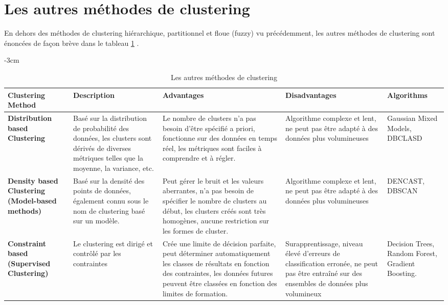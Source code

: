 \section{Les autres méthodes de clustering}
En dehors des méthodes de clustering hiérarchique, partitionnel et floue (fuzzy) vu précédemment, les autres méthodes de clustering sont énoncées de façon brève dans le tableau \ref{other_clustering_methods} . 
\begin{table}[H]
	\centering
	\addtolength{\leftskip} {-3cm}
	\addtolength{\rightskip}{-4cm}
	\begin{tabular}{|m{3cm}|m{4cm}|m{5cm}|m{3cm}|m{2cm}|} %
	\hline
	\rowcolor{blueforest}
	\color{white} \textbf{Clustering Method} & \color{white} \textbf{Description} & \color{white} \textbf{Advantages} & \color{white} \textbf{Disadvantages} & \color{white} \textbf{Algorithms}\\
	\hline\hline
	\textbf{Distribution based Clustering}  & Basé sur la distribution de probabilité des données, les clusters sont dérivés de diverses métriques telles que la moyenne, la variance, etc. & Le nombre de clusters n'a pas besoin d'être spécifié a priori, fonctionne sur des données en temps réel, les métriques sont faciles à comprendre et à régler. & Algorithme complexe et lent, ne peut pas être adapté à des données plus volumineuses & Gaussian Mixed Models, DBCLASD\\ \hline
	\textbf{Density based Clustering (Model-based methods)} & Basé sur la densité des points de données, également connu sous le nom de clustering basé sur un modèle. & Peut gérer le bruit et les valeurs aberrantes, n'a pas besoin de spécifier le nombre de clusters au début, les clusters créés sont très homogènes, aucune restriction sur les formes de cluster.  & Algorithme complexe et lent, ne peut pas être adapté à des données plus volumineuses & DENCAST, DBSCAN \\ \hline
	\textbf{Constraint based (Supervised Clustering)} & Le clustering est dirigé et contrôlé par les contraintes & Crée une limite de décision parfaite, peut déterminer automatiquement les classes de résultats en fonction des contraintes, les données futures peuvent être classées en fonction des limites de formation. & Surapprentissage, niveau élevé d'erreurs de classification erronée, ne peut pas être entraîné sur des ensembles de données plus volumineux & Decision Trees, Random Forest, Gradient Boosting. \\ \hline
	\end{tabular}
	\caption{Les autres méthodes de clustering}
	\label{other_clustering_methods}
\end{table}

